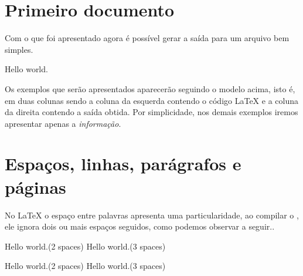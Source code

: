 \section{Primeiro documento}

Com o que foi apresentado agora é possível gerar a saída para um arquivo  bem simples. \\ 
\begin{minipage}[t]{0.47\linewidth}
    \vspace{-8pt}
\end{minipage} \hfill
\begin{minipage}[t]{0.47\linewidth} \vspace{0pt}
    Hello world.
\end{minipage}

Os exemplos que serão apresentados aparecerão seguindo o modelo acima, isto é, em duas colunas sendo a coluna da esquerda contendo o código LaTeX e a coluna da direita contendo a saída obtida. Por simplicidade, nos demais exemplos iremos apresentar apenas a \textit{informação}.

\section{Espaços, linhas, parágrafos e páginas} \label{sss:lates:space}

No LaTeX o espaço entre palavras apresenta uma particularidade, ao compilar o , ele ignora dois ou mais espaços seguidos, como podemos observar a seguir.. \\
\begin{minipage}[t]{0.47\linewidth} \vspace{-8pt}
    \begin{latexcode}
        Hello  world.(2 spaces)
        Hello   world.(3 spaces)
    \end{latexcode}
\end{minipage} \hfill
\begin{minipage}[t]{0.47\linewidth} \vspace{0pt}
    Hello  world.(2 spaces)
    Hello   world.(3 spaces)
\end{minipage}

